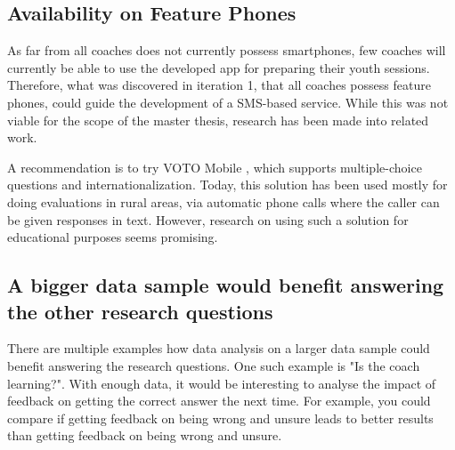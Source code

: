 \subsection{Availability on Feature Phones}
As far from all coaches does not currently possess smartphones, few coaches will currently be able to use the developed app for preparing their youth sessions. Therefore, what was discovered in iteration 1, that all coaches possess feature phones, could guide the development of a SMS-based service. While this was not viable for the scope of the master thesis, research has been made into related work.

A recommendation is to try VOTO Mobile \cite{voto-mobile}, which supports multiple-choice questions and internationalization. Today, this solution has been used mostly for doing evaluations in rural areas, via automatic phone calls where the caller can be given responses in text. However, research on using such a solution for educational purposes seems promising.

\subsection{A bigger data sample would benefit answering the other research questions}
There are multiple examples how data analysis on a larger data sample could benefit answering the research questions. One such example is "Is the coach learning?". With enough data, it would be interesting to analyse the impact of feedback on getting the correct answer the next time. For example, you could compare if getting feedback on being wrong and unsure leads to better results than getting feedback on being wrong and unsure.
